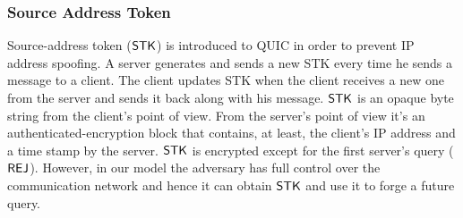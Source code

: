 \subsubsection{Source Address Token} \label{sec:source_address_token}
Source-address token ($\mathsf{STK}$) is introduced to QUIC in order to prevent IP address spoofing. A server generates and sends a new STK every time he sends a message to a client. The client updates STK when the client receives a new one from the server and sends it back along with his message. $\mathsf{STK}$ is an opaque byte string from the client's point of view. From the server's point of view it's an authenticated-encryption block that contains, at least, the client's IP address and a time stamp by the server. $\mathsf{STK}$ is encrypted except for the first server's query ($\mathsf{REJ}$). However, in our model the adversary has full control over the communication network and hence it can obtain $\mathsf{STK}$ and use it to forge a future query.